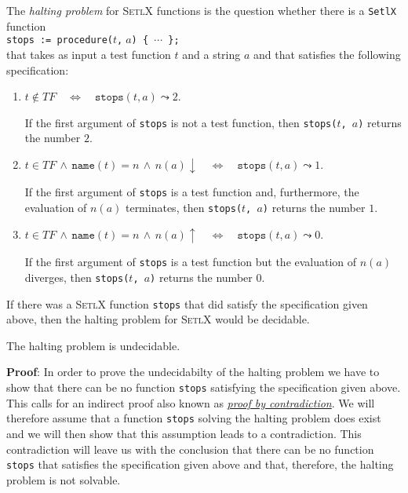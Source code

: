\noindent
The \emph{halting problem} for \textsc{SetlX} functions is the question whether there is a
\texttt{SetlX} function \\[0.2cm]
\hspace*{1.3cm} 
\texttt{stops := procedure($t$,$\;a$) \{ $\cdots$ \};} 
\\[0.2cm]
that takes as input a test function $t$ and a string $a$ and that satisfies the following specification:
\begin{enumerate}
\item $t \not\in T\!F \quad\Leftrightarrow\quad \mathtt{stops}(t, a) \leadsto 2$.

      If the first argument of \texttt{stops} is not a test function, then 
      \texttt{stops($t$, $a$)} returns the number $2$.

\item $t \in T\!F \,\wedge\, \mathtt{name}(t) = n \,\wedge\, n(a)\downarrow \quad\Leftrightarrow\quad
       \mathtt{stops}(t, a) \leadsto 1$.

      If the first argument of \texttt{stops} is a test function and, furthermore,
      the evaluation of $n(a)$ terminates, then \texttt{stops($t$, $a$)} returns the number $1$.

\item $t \in T\!F \,\wedge\, \mathtt{name}(t) = n \,\wedge\, n(a)\uparrow \quad\Leftrightarrow\quad
       \mathtt{stops}(t, a) \leadsto 0$.

      If the first argument of \texttt{stops} is a test function but the evaluation of $n(a)$ 
      diverges, then \texttt{stops($t$, $a$)} returns the number $0$.
\end{enumerate}
If there was a \textsc{SetlX} function \texttt{stops} that did satisfy the specification given above,
then the halting problem for \textsc{SetlX} would be decidable.

\begin{Theorem}
  The halting problem is undecidable.
\end{Theorem}

\noindent
\textbf{Proof}:  In order to prove the undecidabilty of the halting problem we have to show that
there can be no function \texttt{stops} satisfying the specification given above.  This calls for an
indirect proof also known as \href{http://en.wikipedia.org/wiki/Indirect_proof}{\emph{proof by contradiction}}.
We will therefore assume that a function \texttt{stops} solving the halting problem does
exist and we will then show that this assumption leads to a contradiction.  This contradiction will
leave us with the conclusion that there can be no function \texttt{stops} that satisfies
the specification given above and that, therefore, the halting problem is not solvable.

